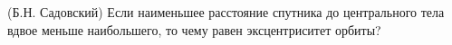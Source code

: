 (Б.Н. Садовский)
Если наименьшее расстояние спутника до центрального тела вдвое меньше
наибольшего, то чему равен эксцентриситет орбиты?
